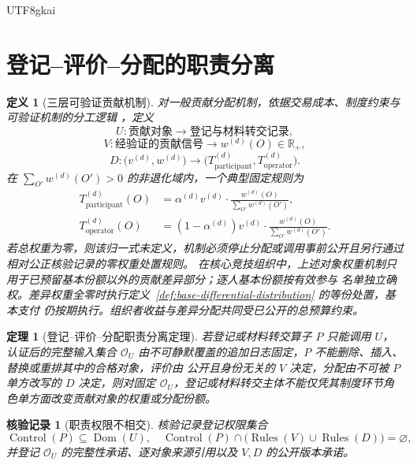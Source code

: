 \documentclass[12pt,a4paper,openany]{report}
\newtheorem{definition}{定义}[chapter]
\newtheorem{theorem}{定理}[chapter]
\newtheorem{Certificate}{核验记录}[chapter]
\newcommand{\RR}{\mathbb R}
\begin{document}
\begin{CJK*}{UTF8}{gkai}
\section{登记--评价--分配的职责分离}

\begin{definition}[三层可验证贡献机制]
对一般贡献分配机制，依据交易成本、制度约束与可验证机制的分工逻辑
\cite{Coase1937Firm,North1990Institutions,Myerson1981OptimalAuction}，定义
\[
  U:\text{贡献对象}\to\text{登记与材料转交记录},
\]
\[
  V:\text{经验证的贡献信号}\to w^{(d)}(O)\in\RR_+,
\]
\[
  D:\bigl(v^{(d)},w^{(d)}\bigr)
  \to
  \bigl(T_{\mathrm{participant}}^{(d)},T_{\mathrm{operator}}^{(d)}\bigr).
\]
在 \(\sum_{O'}w^{(d)}(O')>0\) 的非退化域内，一个典型固定规则为
\[
\begin{aligned}
T_{\mathrm{participant}}^{(d)}(O)
&=
\alpha^{(d)}v^{(d)}
\cdot
\frac{w^{(d)}(O)}{\sum_{O'}w^{(d)}(O')},\\
T_{\mathrm{operator}}^{(d)}(O)
&=
(1-\alpha^{(d)})v^{(d)}
\cdot
\frac{w^{(d)}(O)}{\sum_{O'}w^{(d)}(O')}.
\end{aligned}
\]
若总权重为零，则该归一式未定义，机制必须停止分配或调用事前公开且另行通过相对公正核验记录的零权重处置规则。
在核心竞技组织中，上述对象权重机制只用于已预留基本份额以外的贡献差异部分；逐人基本份额按有效参与
名单独立确权。差异权重全零时执行定义~\ref{def:base-differential-distribution} 的等份处置，基本支付
仍按期执行。组织者收益与差异分配共同受已公开的总预算约束。
\end{definition}

\begin{theorem}[登记--评价--分配职责分离定理]
\label{thm:uvd-separation}
若登记或材料转交算子 \(P\) 只能调用 \(U\)，认证后的完整输入集合
\(\mathcal O_U\) 由不可静默覆盖的追加日志固定，\(P\) 不能删除、插入、替换或重排其中的合格对象，评价由
公开且身份无关的 \(V\) 决定，分配由不可被 \(P\) 单方改写的 \(D\) 决定，则对固定
\(\mathcal O_U\)，登记或材料转交主体不能仅凭其制度环节角色单方面改变贡献对象的权重或分配份额。
\end{theorem}

\begin{Certificate}[职责权限不相交]
核验记录登记权限集合
\[
  \operatorname{Control}(P)\subseteq\operatorname{Dom}(U),
\quad
\operatorname{Control}(P)\cap
  \bigl(\operatorname{Rules}(V)\cup\operatorname{Rules}(D)\bigr)=\varnothing,
\]
并登记 \(\mathcal O_U\) 的完整性承诺、逐对象来源引用以及 \(V,D\) 的公开版本承诺。
\end{Certificate}


\end{CJK*}
\end{document}
